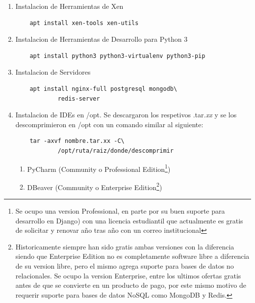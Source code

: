 \begin{enumerate}
\begin{lstlisting}
	auto xenbr0
	iface xenbr0 inet static
		address 10.10.10.1
		netmask 255.255.255.0
		bridge_ports wlan0

	#other possibly useful options in a
	#	virtualized environment
		#bridge_stp off		# disable
		#		Spanning Tree Protocol
		#bridge_waitport 0	# no delay
		#		before a port becomes
		#		available
		#bridge_fd 0		# no forwarding
		#		delay

	## configure a (separate) bridge for
	#	the DomUs without giving Dom0 an
	#	IP on it
	#auto xenbr1
	#iface xenbr1 inet manual
	#   bridge_ports eth1

	EOF

	reboot
		\end{lstlisting}
	\item Instalacion de Herramientas de Xen
		\begin{lstlisting}
	apt install xen-tools xen-utils
		\end{lstlisting}
    \item Instalacion de Herramientas de Desarrollo para Python 3
    	\begin{lstlisting}
	apt install python3 python3-virtualenv python3-pip
    	\end{lstlisting}
    \item Instalacion de Servidores
    	\begin{lstlisting}
	apt install nginx-full postgresql mongodb\
    		redis-server
    	\end{lstlisting}
    \item Instalacion de IDEs en /opt. Se descargaron los respetivos .tar\textit{.xx} y se los descomprimieron en /opt con un comando similar al siguiente:
    	\begin{lstlisting}
	tar -axvf nombre.tar.xx -C\
    		/opt/ruta/raiz/donde/descomprimir
    	\end{lstlisting}
    \begin{enumerate}
    	\item PyCharm (Community o Professional Edition\footnote{Se ocupo una version Professional, en parte por su buen suporte para desarrollo en Django) con una licencia estudiantil que actualmente es gratis de solicitar y renovar año tras año con un correo institucional})
        \item DBeaver (Community o Enterprise Edition\footnote{Historicamente siempre han sido gratis ambas versiones con la diferencia siendo que Enterprise Edition no es completamente software libre a diferencia de su version libre, pero el mismo agrega suporte para bases de datos no relacionales. Se ocupo la version Enterprise, entre los ultimos ofertas gratis antes de que se convierte en un producto de pago, por este mismo motivo de requerir suporte para bases de datos NoSQL como MongoDB y Redis.})
    \end{enumerate}
\end{enumerate}

